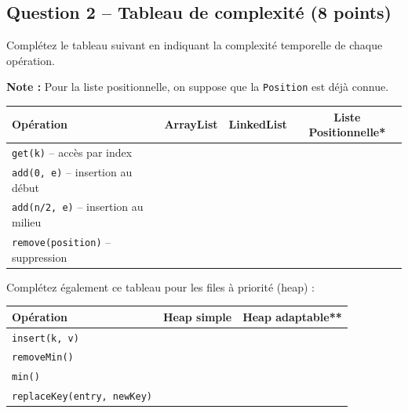 \documentclass[11pt,letterpaper]{article}
\begin{document}
\newpage

\subsection*{Question 2 -- Tableau de complexité (8 points)}

Complétez le tableau suivant en indiquant la complexité temporelle de chaque opération.

\textbf{Note :} Pour la liste positionnelle, on suppose que la \texttt{Position} est déjà connue.

\vspace{0.5em}

\begin{center}
\renewcommand{\arraystretch}{1.8}
\begin{tabular}{|l|c|c|c|}
\hline
\textbf{Opération} & \textbf{ArrayList} & \textbf{LinkedList} & \textbf{Liste Positionnelle*} \\
\hline
\texttt{get(k)} -- accès par index & & & \\
\hline
\texttt{add(0, e)} -- insertion au début & & & \\
\hline
\texttt{add(n/2, e)} -- insertion au milieu & & & \\
\hline
\texttt{remove(position)} -- suppression & & & \\
\hline
\end{tabular}
\end{center}

\vspace{1em}

Complétez également ce tableau pour les files à priorité (heap) :

\vspace{0.5em}

\begin{center}
\renewcommand{\arraystretch}{1.8}
\begin{tabular}{|l|c|c|}
\hline
\textbf{Opération} & \textbf{Heap simple} & \textbf{Heap adaptable**} \\
\hline
\texttt{insert(k, v)} & & \\
\hline
\texttt{removeMin()} & & \\
\hline
\texttt{min()} & & \\
\hline
\texttt{replaceKey(entry, newKey)} & & \\
\hline
\end{tabular}
\end{center}
\end{document}
